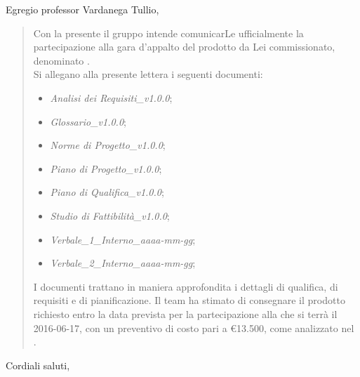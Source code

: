 \documentclass{letter}
\begin{document}
\begin{letter}
		\opening{Egregio professor Vardanega Tullio,}
			\begin{quotation}			
				Con la presente il gruppo \gruppo intende comunicarLe ufficialmente la partecipazione alla gara d'appalto del prodotto da Lei commissionato, denominato \textbf{\progetto}.
				\\
				Si allegano alla presente lettera i seguenti documenti:
				\begin{itemize}
					\item \textit{Analisi dei Requisiti\_v1.0.0};
					\item \textit{Glossario\_v1.0.0};
					\item \textit{Norme di Progetto\_v1.0.0};
					\item \textit{Piano di Progetto\_v1.0.0};
					\item \textit{Piano di Qualifica\_v1.0.0};
					\item \textit{Studio di Fattibilità\_v1.0.0};
					\item \textit{Verbale\_1\_Interno\_aaaa-mm-gg};
					\item \textit{Verbale\_2\_Interno\_aaaa-mm-gg};
				\end{itemize}
				I documenti trattano in maniera approfondita i dettagli di qualifica, di requisiti e di pianificazione.	
				Il team ha stimato di consegnare il prodotto richiesto entro la data prevista per la partecipazione alla \textit{\RA} che si terrà il 2016-06-17, con un preventivo di costo pari a \euro13.500, come analizzato nel \textit{\PdP}.	
			\end{quotation}
		\closing{Cordiali saluti,}
	\end{letter}
\end{document}
